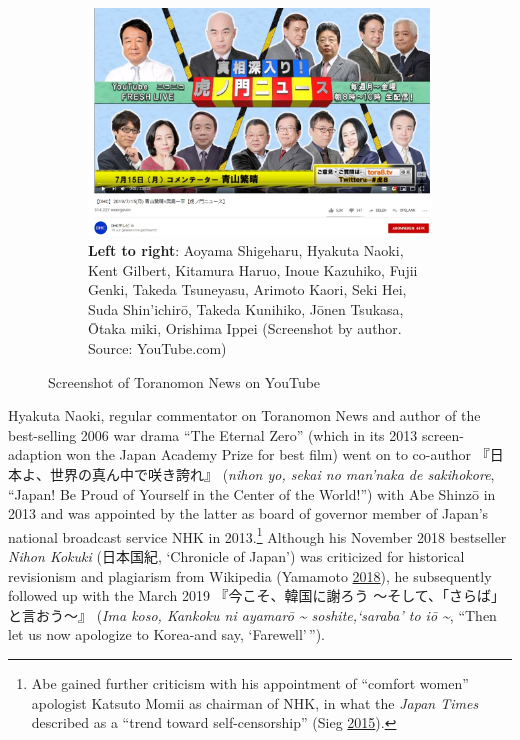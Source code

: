 \documentclass[10pt,british,A4paper,,openany]{memoir}
\begin{document}
\begin{figure}[!htb]
 \centering
 \begin{subfigure}[b]{0.5\textwidth}
  \includegraphics[width=\textwidth]{images/2channel/toranomon.jpg} 
  \captionsetup[sub]{font=scriptsize}
  \caption*{\textbf{Left to right}: Aoyama Shigeharu, Hyakuta Naoki, Kent Gilbert, Kitamura Haruo, Inoue Kazuhiko, Fujii Genki, Takeda Tsuneyasu, Arimoto Kaori, Seki Hei, Suda Shin'ichirō, Takeda Kunihiko, Jōnen Tsukasa, Ōtaka miki, Orishima Ippei (Screenshot by author. Source: YouTube.com)}
 \end{subfigure}
 \caption{Screenshot of Toranomon News on YouTube}\label{fig:toranomon}
\end{figure}

Hyakuta Naoki, regular commentator on Toranomon News and author of the
best-selling 2006 war drama ``The Eternal Zero'' (which in its 2013
screen-adaption won the Japan Academy Prize for best film) went on to
co-author 『日本よ、世界の真ん中で咲き誇れ』 (\emph{nihon yo, sekai no
man'naka de sakihokore}, ``Japan! Be Proud of Yourself in the Center of
the World!'') with Abe Shinzō in 2013 and was appointed by the latter as
board of governor member of Japan's national broadcast service NHK in
2013.\footnote{Abe gained further criticism with his appointment of
  ``comfort women'' apologist Katsuto Momii as chairman of NHK, in what
  the \emph{Japan Times} described as a ``trend toward self-censorship''
  (Sieg \protect\hyperlink{ref-sieg_under_2015}{2015}).} Although his
November 2018 bestseller \emph{Nihon Kokuki} (日本国紀, `Chronicle of
Japan') was criticized for historical revisionism and plagiarism from
Wikipedia (Yamamoto \protect\hyperlink{ref-yamamoto__2018}{2018}), he
subsequently followed up with the March 2019 『今こそ、韓国に謝ろう
～そして、「さらば」と言おう～』 (\emph{Ima koso, Kankoku ni ayamarō
\textasciitilde{} soshite,`saraba' to iō \textasciitilde{}}, ``Then let
us now apologize to Korea-and say, `Farewell'\,'').
\end{document}
